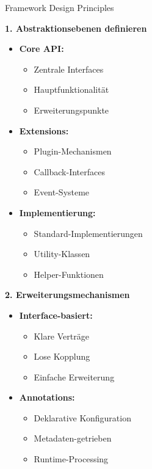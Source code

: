 \begin{KR}{Framework Design Principles}

\begin{minipage}[t]{0.5\textwidth}
\textbf{1. Abstraktionsebenen definieren}
\begin{itemize}
    \item \textbf{Core API:}
    \begin{itemize}
        \item Zentrale Interfaces
        \item Hauptfunktionalität
        \item Erweiterungspunkte
    \end{itemize}
    
    \item \textbf{Extensions:}
    \begin{itemize}
        \item Plugin-Mechanismen
        \item Callback-Interfaces
        \item Event-Systeme
    \end{itemize}
    
    \item \textbf{Implementierung:}
    \begin{itemize}
        \item Standard-Implementierungen
        \item Utility-Klassen
        \item Helper-Funktionen
    \end{itemize}
\end{itemize}
\end{minipage}
\begin{minipage}[t]{0.5\textwidth}
\textbf{2. Erweiterungsmechanismen}
\begin{itemize}
    \item \textbf{Interface-basiert:}
    \begin{itemize}
        \item Klare Verträge
        \item Lose Kopplung
        \item Einfache Erweiterung
    \end{itemize}
    
    \item \textbf{Annotations:}
    \begin{itemize}
        \item Deklarative Konfiguration
        \item Metadaten-getrieben
        \item Runtime-Processing
    \end{itemize}
    

\end{itemize}
\end{minipage}
\end{KR}
